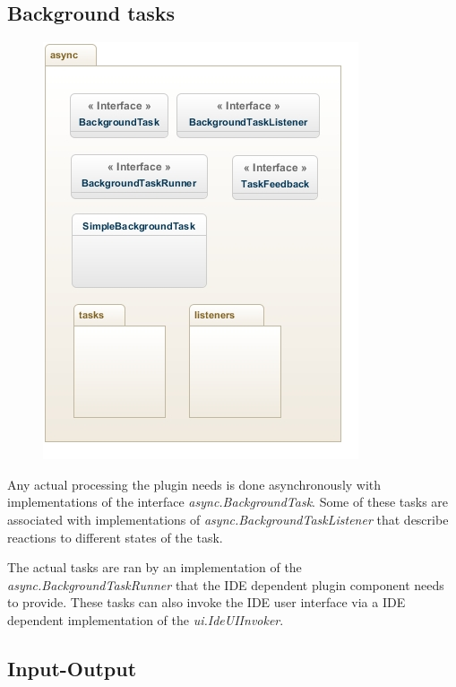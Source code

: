\documentclass[12pt,a4paper,english,leqno]{article}
\begin{document}
\subsection{Background tasks}

\begin{figure}[ht!]
\centering
\includegraphics[scale=1]{img/async.jpg}
\end{figure}

Any actual processing the plugin needs is done asynchronously with implementations of the interface \textit{async.BackgroundTask}. Some of these tasks are associated with implementations of \textit{async.BackgroundTaskListener} that describe reactions to different states of the task.

The actual tasks are ran by an implementation of the \textit{async.BackgroundTaskRunner} that the IDE dependent plugin component needs to provide. These tasks can also invoke the IDE user interface via a IDE dependent implementation of the \textit{ui.IdeUIInvoker}.

\subsection{Input-Output}
\end{document}
